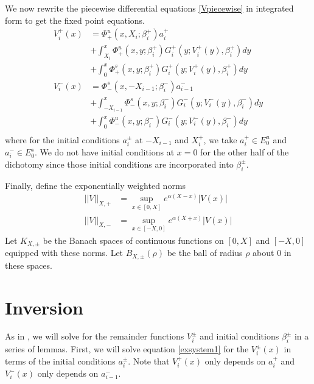 \documentclass[thesis.tex]{subfiles}
\begin{document}
We now rewrite the piecewise differential equations \eqref{Vpiecewise} in integrated form to get the fixed point equations.
\begin{equation}\label{FPequations}
\begin{aligned}
V_i^+(x) &= \Phi^u_+(x, X_i; \beta_i^+) a_i^+  \\
&+ \int_{X_i}^x \Phi_+^u(x, y; \beta_i^+) G_i^+(y; V_i^+(y),\beta_i^+)dy \\
&+ \int_0^x \Phi_+^s(x, y; \beta_i^+) G_i^+(y; V_i^+(y),\beta_i^+)dy \\ 
V_i^-(x) &= \Phi^s_-(x, -X_{i-1}; \beta_i^-) a_{i-1}^-  \\
&+ \int_{-X_{i-1}}^x \Phi_-^s(x, y; \beta_i^-) G_i^-(y; V_i^-(y),\beta_i^-)dy \\
&+ \int_0^x \Phi_-^u(x, y; \beta_i^-) G_i^-(y; V_i^-(y),\beta_i^-)dy \\
\end{aligned}
\end{equation}
where for the initial conditions $a_i^\pm$ at $-X_{i-1}$ and $X_i^+$, we take $a_i^+ \in E_0^u$ and $a_i^- \in E_0^s$. We do not have initial conditions at $x = 0$ for the other half of the dichotomy since those initial conditions are incorporated into $\beta_i^\pm$.

Finally, define the exponentially weighted norms
\begin{equation}\label{expwtnorm}
\begin{aligned}
||V||_{X, +} &= \sup_{x \in [0, X]} e^{\alpha(X - x)}|V(x)| \\
||V||_{X, -} &= \sup_{x \in [-X, 0]} e^{\alpha(X + x)}|V(x)|
\end{aligned}
\end{equation}
Let $K_{X, \pm}$ be the Banach spaces of continuous functions on $[0, X]$ and $[-X, 0]$ equipped with these norms. Let $B_{X, \pm}(\rho)$ be the ball of radius $\rho$ about $0$ in these spaces.

\section{Inversion}

As in \cite{SandstedeStrut}, we will solve for the remainder functions $V_i^\pm$ and initial conditions $\beta_i^\pm$ in a series of lemmas. First, we will solve equation \cref{exsystem1} for the $V_i^\pm(x)$ in terms of the initial conditions $a_i^\pm$. Note that $V_i^+(x)$ only depends on $a_i^+$ and $V_i^-(x)$ only depends on $a_{i-1}^-$.
\end{document}
